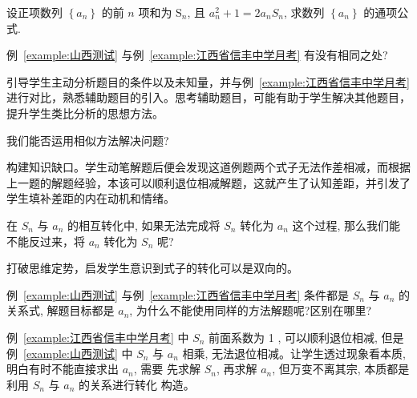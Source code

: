 \begin{example}[2019·山西测试]\label{example:山西测试}
  设正项数列 $\left\{a_{n}\right\}$ 的前 $n$ 项和为 $\mathrm{S}_{n}$, 且 $a_{n}^{2}+1=2 a_{n} S_{n}$, 求数列 $\left\{a_{n}\right\}$ 的通项公式.
\end{example}

\begin{question}
  例~\ref{example:山西测试} 与例~\ref{example:江西省信丰中学月考} 有没有相同之处?
\end{question}

\begin{designgoal}
  引导学生主动分析题目的条件以及未知量，并与例~\ref{example:江西省信丰中学月考} 进行对比，熟悉辅助题目的引入。思考辅助题目，可能有助于学生解决其他题目，提升学生类比分析的思想方法。
\end{designgoal}

\begin{question}
  我们能否运用相似方法解决问题?
\end{question}

\begin{designgoal}
  构建知识缺口。学生动笔解题后便会发现这道例题两个式子无法作差相减，而根据上一题的解题经验，本该可以顺利退位相减解题，这就产生了认知差距，并引发了学生填补差距的内在动机和情绪。
\end{designgoal}

\begin{question}
  在 $S_{n}$ 与 $a_{n}$ 的相互转化中, 如果无法完成将 $S_{n}$ 转化为 $a_{n}$ 这个过程, 那么我们能不能反过来，将 $a_{n}$ 转化为 $S_n$ 呢?
\end{question}

\begin{designgoal}
  打破思维定势，启发学生意识到式子的转化可以是双向的。
\end{designgoal}


\begin{question}
  例~\ref{example:山西测试} 与例~\ref{example:江西省信丰中学月考} 条件都是 $S_{n}$ 与 $a_{n}$ 的关系式, 解题目标都是 $a_{n}$, 为什么不能使用同样的方法解题呢?区别在哪里?
\end{question}

\begin{designgoal}
  例~\ref{example:江西省信丰中学月考} 中 $S_n$ 前面系数为 1 , 可以顺利退位相减, 但是例~\ref{example:山西测试} 中 $S_n$ 与 $a_n$ 相乘, 无法退位相减。让学生透过现象看本质, 明白有时不能直接求出 $a_{n}$, 需要 先求解 $S_n$, 再求解 $a_n$, 但万变不离其宗, 本质都是利用 $S_n$ 与 $a_n$ 的关系进行转化 构造。
\end{designgoal}

